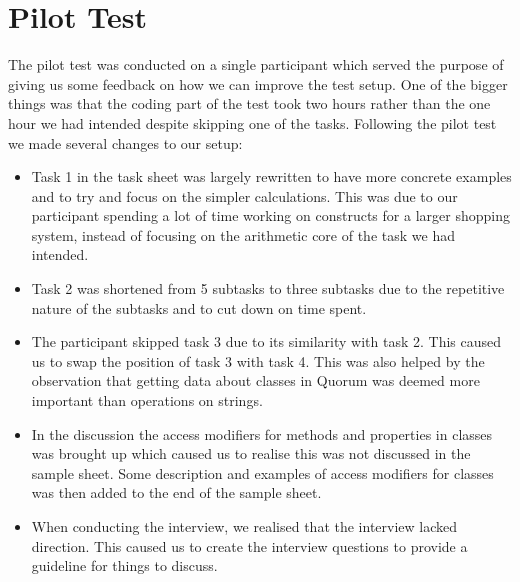 \section{Pilot Test}
The pilot test was conducted on a single participant which served the purpose of giving us some feedback on how we can improve the test setup.
One of the bigger things was that the coding part of the test took two hours rather than the one hour we had intended despite skipping one of the tasks.
Following the pilot test we made several changes to our setup:
\begin{itemize}
\item Task 1 in the task sheet was largely rewritten to have more concrete examples and to try and focus on the simpler calculations.
This was due to our participant spending a lot of time working on constructs for a larger shopping system, instead of focusing on the arithmetic core of the task we had intended.
\item Task 2 was shortened from 5 subtasks to three subtasks due to the repetitive nature of the subtasks and to cut down on time spent.
\item The participant skipped task 3 due to its similarity with task 2.
This caused us to swap the position of task 3 with task 4.
This was also helped by the observation that getting data about classes in Quorum was deemed more important than operations on strings.
\item In the discussion the access modifiers for methods and properties in classes was brought up which caused us to realise this was not discussed in the sample sheet.
Some description and examples of access modifiers for classes was then added to the end of the sample sheet.
\item When conducting the interview, we realised that the interview lacked direction.
This caused us to create the interview questions to provide a guideline for things to discuss.
\end{itemize}